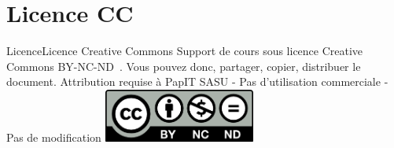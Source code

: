 \documentclass{beamer}
\begin{document}
    \section{Licence CC}\label{sec:licence}

    \begin{frame}{Licence}{Licence Creative Commons}
        Support de cours sous licence Creative Commons BY-NC-ND~.
        \bigbreak
        Vous pouvez donc, partager, copier, distribuer le document.
        \bigbreak
        Attribution requise à PapIT SASU - Pas d’utilisation commerciale - Pas de modification
        \bigbreak
        \centering
        \includegraphics[width=5cm]{image/by-nc-nd-logo}
    \end{frame}
\end{document}
